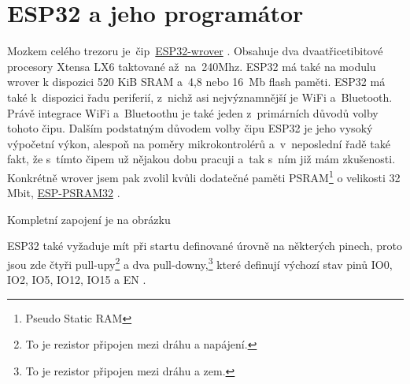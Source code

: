 \section{ESP32 a jeho programátor}


Mozkem celého trezoru je~čip~\href{https://www.espressif.com/sites/default/files/documentation/esp32-wrover-b_datasheet_en.pdf}{ESP32-wrover} \parencite{ESP32-WROVER-B}. 
Obsahuje dva dva\-a\-tři\-ce\-ti\-bi\-to\-vé procesory Xtensa LX6 taktované až~na~240Mhz. ESP32 \parencite{ESP32} má také na modulu wrover k dispozici 520 KiB SRAM 
a~4,8 nebo 16~Mb flash paměti. ESP32 má také k~dispozici řadu periferií, z~nichž asi nejvýznamnější je WiFi a~Bluetooth. Právě integrace 
WiFi a~Bluetoothu je také jeden z~primárních důvodů volby tohoto čipu. Dalším podstatným důvodem volby čipu ESP32 je jeho vysoký výpočetní výkon, 
alespoň na poměry mikrokontrolérů a~v~neposlední řadě také fakt, že s~tímto čipem už nějakou dobu pracuji a~tak s~ním již mám zkušenosti. 
Konkrétně wrover jsem pak zvolil kvůli dodatečné paměti PSRAM\footnote{Pseudo Static RAM} o velikosti 32 Mbit, 
\href{http://gamma.spb.ru/images/pdf/esp-psram32_datasheet_en.pdf}{ESP-PSRAM32} \parencite{ESP-PSRAM32}.

Kompletní zapojení je na obrázku 

ESP32 také vyžaduje mít při startu definované úrovně na některých pinech, proto jsou zde čtyři pull-upy\footnote{To je rezistor připojen mezi dráhu a napájení.} 
a dva pull-downy,\footnote{To je rezistor připojen mezi dráhu a zem.} které definují výchozí stav pinů IO0, IO2, IO5, IO12, IO15 a EN \parencite{ESP32}.
\begin{table}[h]
    \centering
    \caption{Popis funkce pinů}
    \label{tab:COMPARATION}
\end{table}

